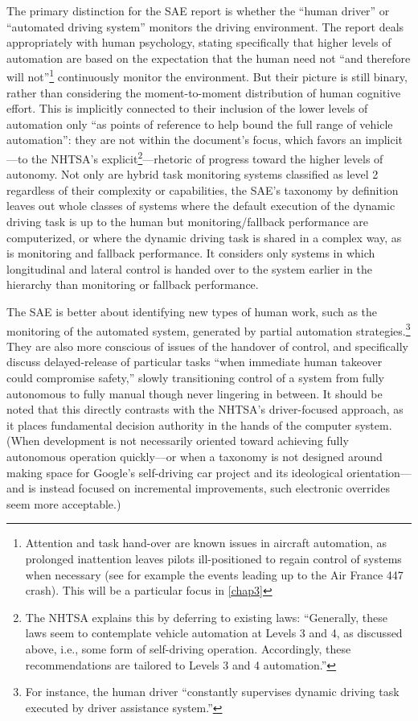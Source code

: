 The primary distinction for the SAE report is whether the ``human driver'' or ``automated
driving system'' monitors the driving environment.\cite[p. 5]{SAE} The report deals
appropriately with human psychology, stating specifically that higher
levels of automation are based on the expectation that the human need
not ``and therefore will not''\footnote{Attention and task hand-over are
  known issues in aircraft automation, as prolonged inattention leaves
  pilots ill-positioned to regain control of systems when necessary
  (see for example the events leading up to the Air France 447
  crash). This will be a particular focus in \ref{chap3}} continuously
monitor the environment.\cite[p. 9]{SAE} But their 
picture is still binary, rather than considering the moment-to-moment
distribution of human 
cognitive effort. This is implicitly connected to their inclusion of
the lower levels of automation only ``as points of reference to help
bound the full range of vehicle automation''\cite[p. 2]{SAE}: they are not within
the document's focus, which favors an implicit---to the NHTSA's
explicit\footnote{The NHTSA explains this by deferring to existing
  laws: ``Generally, these laws seem to contemplate vehicle 
automation at Levels 3 and 4, as discussed above, i.e., some form of
self-driving operation. 
Accordingly, these recommendations are tailored to Levels 3 and 4
automation.''\cite[p. 10]{NHTSA}}---rhetoric of progress toward the
higher levels of autonomy. 
Not only are hybrid task monitoring systems classified as level 2
regardless of their complexity or capabilities, the SAE's taxonomy by
definition leaves out whole classes of systems where the default
execution of the dynamic driving task is up to the human but
monitoring/fallback performance are computerized, or where the dynamic
driving task is shared in a complex way, as is monitoring and fallback
performance. It considers only systems in which longitudinal and
lateral control is handed over to the system earlier in the hierarchy
than monitoring or fallback performance.

The SAE is better about
identifying new types of human work, such as the monitoring of the
automated system, generated by partial automation
strategies.\footnote{For instance, the human driver ``constantly
  supervises dynamic driving task executed by driver assistance
  system.''\cite[p. 3]{SAE}} They
are also more conscious of issues of the handover of control, and
specifically discuss delayed-release of particular tasks ``when
immediate human takeover could compromise safety,'' slowly
transitioning control of a system from fully autonomous to fully
manual though never lingering in between.\cite[p. 4]{SAE} It should be
noted that this directly contrasts with the NHTSA's driver-focused
approach, as it places fundamental decision authority in the hands of
the computer system. (When development is not necessarily oriented
toward achieving fully autonomous operation quickly---or when a
taxonomy is not designed around making space for Google's self-driving
car project and its ideological orientation---and is instead
focused on incremental improvements, such electronic overrides seem more acceptable.)

